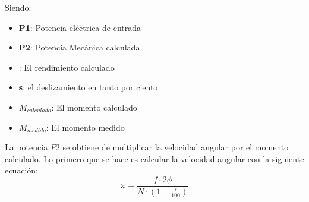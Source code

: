 \documentclass[12pt]{article}
\begin{document}
Siendo:
\begin{itemize}
    \item \textbf{P1}: Potencia eléctrica de entrada
    \item \textbf{P2}: Potencia Mecánica calculada
    \item \textbf{\eta}: El rendimiento calculado
    \item \textbf{s}: el deslizamiento en tanto por ciento
    \item \textbf{$M_{calculado}$}: El momento calculado
    \item  \textbf{$M_{medido}$}: El momento medido
\end{itemize}

La potencia $P2$ se obtiene de multiplicar la velocidad angular por el momento calculado. Lo primero que se hace es calcular la velocidad angular con la siguiente ecuación:
\begin{equation}
{\omega = \frac{f \cdot 2 \phi }{N \cdot \left(1 - \frac{s}{100}\right)}}
\label{eqn:velocidad_angular}
\end{equation}
\end{document}
